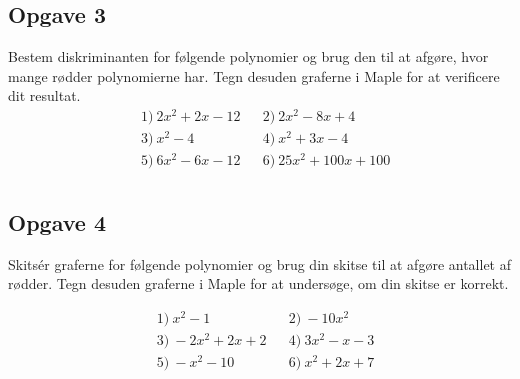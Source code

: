 \subsection*{Opgave 3}
Bestem diskriminanten for følgende polynomier og brug den til at afgøre, hvor mange rødder polynomierne har. Tegn desuden graferne i Maple for at verificere dit resultat.
\begin{align*}
&1) \ 2x^2+2x-12   &&2) \ 2x^2-8x+4   \\
&3) \ x^2-4  &&4) \   x^2+3x-4  \\
&5) \ 6x^2-6x-12  &&6) \ 25x^2+100x+100   \\
\end{align*}

\subsection*{Opgave 4}
Skitsér graferne for følgende polynomier og brug din skitse til at afgøre antallet af rødder. Tegn desuden graferne i Maple for at undersøge, om din skitse er korrekt.

\begin{align*}
&1) \  x^2-1   &&2) \ -10x^2    \\
&3) \   -2x^2+2x+2  &&4) \  3x^2-x-3   \\
&5) \ -x^2-10    &&6) \  x^2+2x+7   \\
\end{align*}

